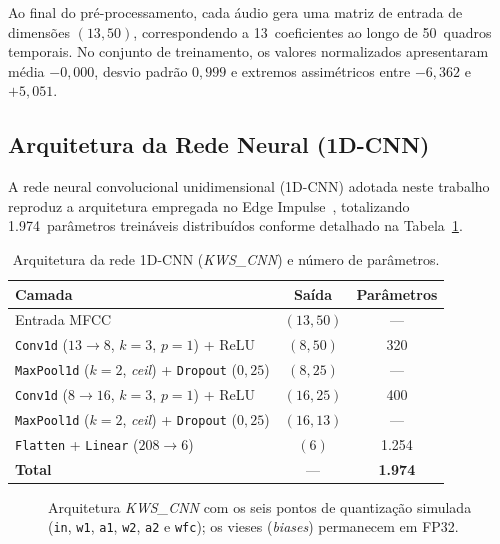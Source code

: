 Ao final do pré-processamento, cada áudio gera uma matriz de entrada de dimensões $(13, 50)$, correspondendo a 13~coeficientes ao longo de 50~quadros temporais. No conjunto de
treinamento, os valores normalizados apresentaram média $-0{,}000$, desvio padrão $0{,}999$ e extremos assimétricos entre $-6{,}362$ e $+5{,}051$.

\subsection{Arquitetura da Rede Neural (1D-CNN)}

A rede neural convolucional unidimensional (1D-CNN) adotada neste trabalho reproduz a arquitetura empregada no Edge Impulse~\cite{carlos2025}, totalizando 1.974~parâmetros treináveis
distribuídos conforme detalhado na Tabela~\ref{tab:arquitetura}.                                                                                                                       

\begin{table}[htbp]
\centering
\setlength{\tabcolsep}{3.5pt}
\caption{Arquitetura da rede 1D-CNN (\textit{KWS\_CNN}) e número de parâmetros.}
\label{tab:arquitetura}
\begin{tabular}{lcc}   
\toprule            
\textbf{Camada} & \textbf{Saída} & \textbf{Parâmetros} \\
\midrule
Entrada MFCC & $(13, 50)$ & --- \\
\texttt{Conv1d} ($13 \to 8$, $k=3$, $p=1$) + ReLU & $(8, 50)$ & 320 \\
\texttt{MaxPool1d} ($k=2$, \textit{ceil}) + \texttt{Dropout} ($0{,}25$) & $(8, 25)$ & --- \\
\texttt{Conv1d} ($8 \to 16$, $k=3$, $p=1$) + ReLU & $(16, 25)$ & 400 \\
\texttt{MaxPool1d} ($k=2$, \textit{ceil}) + \texttt{Dropout} ($0{,}25$) & $(16, 13)$ & --- \\
\texttt{Flatten} + \texttt{Linear} ($208 \to 6$) & $(6)$ & 1.254 \\
\midrule
\textbf{Total} & --- & \textbf{1.974} \\
\bottomrule
\end{tabular}
\end{table}

\begin{figure}[htbp]
\centering
\resizebox{\columnwidth}{!}{}
\caption{Arquitetura \textit{KWS\_CNN} com os seis pontos de quantização simulada (\texttt{in}, \texttt{w1}, \texttt{a1}, \texttt{w2}, \texttt{a2} e \texttt{wfc}); os vieses (\textit{biases}) permanecem em FP32.}
\label{fig:arquitetura}
\end{figure}


